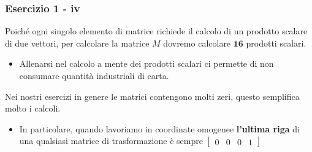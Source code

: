 \documentclass{beamer}
\begin{document}
\begin{frame}
\frametitle{Esercizio 1 - iv}

Poich\'e ogni singolo elemento di matrice richiede il calcolo di un prodotto scalare di due vettori,
    per calcolare la matrice $M$ dovremo calcolare $\mathbf{16}$ prodotti scalari.
    \begin{itemize}
        \item Allenarsi nel calcolo a mente dei prodotti scalari ci permette di non 
            consumare quantit\`a industriali di carta.
    \end{itemize}
    Nei nostri esercizi in genere le matrici contengono molti zeri, questo semplifica molto i calcoli.
    \begin{itemize}
        \item In particolare, quando lavoriamo in coordinate omogenee \textbf{l'ultima riga} di una
            qualsiasi matrice di trasformazione \`e sempre 
$\begin{bmatrix} 0 & 0 &  0 &  1 \end{bmatrix}  $
    \end{itemize}

\end{frame}
\end{document}
